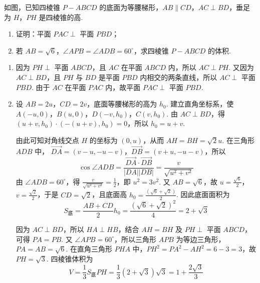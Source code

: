 \begin{problem}
如图，已知四棱锥 \(P - ABCD\) 的底面为等腰梯形，\(AB \parallel CD\)，\(AC \perp BD\)，垂足为 \(H\)，\(PH\) 是四棱锥的高.

\begin{enumerate}
\item 证明：平面 \(PAC \perp\) 平面 \(PBD\)；
\item 若 \(AB = \sqrt{6}\)，\(\angle APB = \angle ADB = 60^{\circ}\)，求四棱锥 \(P - ABCD\) 的体积.
\end{enumerate}

\end{problem}

\begin{solution}
\begin{enumerate}
\item 因为 \(PH\perp\) 平面 \(ABCD\)，且 \(AC\) 在平面 \(ABCD\) 内，所以 \(AC\perp PH\). 又因为 \(AC\perp BD\)，且 \(PH\) 与 \(BD\) 是平面 \(PBD\) 内相交的两条直线，所以 \(AC\perp\) 平面 \(PBD\). 由于 \(AC\) 在平面 \(PAC\) 内，故平面 \(PAC\perp\) 平面 \(PBD\).

\item 设 \(AB=2u\)，\(CD=2v\)，底面等腰梯形的高为 \(h_0\). 建立直角坐标系，使
\(A(-u,0)\)，\(B(u,0)\)，\(D(-v,h_0)\)，\(C(v,h_0)\). 由 \(AC\perp BD\)，得
\((u+v,h_0)\cdot (-(u+v),h_0)=0\)，所以 \(h_0=u+v\).

由此可知对角线交点 \(H\) 的坐标为 \((0,u)\)，从而 \(AH=BH=\sqrt{2}u\). 在三角形 \(ADB\) 中，
\(\overrightarrow{DA}=(v-u,-u-v)\)，\(\overrightarrow{DB}=(v+u,-u-v)\)，所以
\[
\cos\angle ADB
=\frac{\overrightarrow{DA}\cdot\overrightarrow{DB}}{|DA||DB|}
=\frac{v}{\sqrt{u^2+v^2}}
\]
由 \(\angle ADB=60^\circ\)，得 \(\frac{v}{\sqrt{u^2+v^2}}=\frac{1}{2}\)，即 \(u^2=3v^2\). 又 \(AB=\sqrt{6}\)，故 \(u=\frac{\sqrt{6}}{2}\)，\(v=\frac{\sqrt{2}}{2}\)，于是 \(CD=\sqrt{2}\)，且底面高 \(h_0=\frac{(\sqrt{6}+\sqrt{2})}{2}\). 因此底面面积为
\[
S_{\text{底}}=\frac{AB+CD}{2}h_0
=\frac{(\sqrt{6}+\sqrt{2})^2}{4}=2+\sqrt{3}
\]

因为 \(AC\perp BD\)，所以 \(HA\perp HB\)，结合 \(AH=BH\) 及 \(PH\perp\) 平面 \(ABCD\)，可得 \(PA=PB\). 又 \(\angle APB=60^\circ\)，所以三角形 \(APB\) 为等边三角形，\(PA=AB=\sqrt{6}\). 在直角三角形 \(PHA\) 中，\(PH^2=PA^2-AH^2=6-3=3\)，故 \(PH=\sqrt{3}\). 四棱锥体积为
\[
V=\frac{1}{3}S_{\text{底}}PH
=\frac{1}{3}(2+\sqrt{3})\sqrt{3}
=1+\frac{2\sqrt{3}}{3}
\]
\end{enumerate}
\end{solution}

